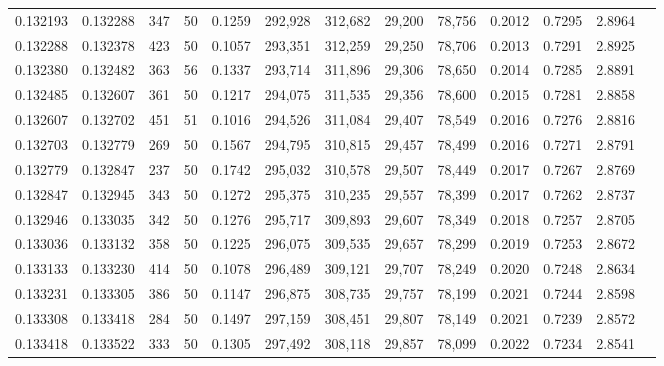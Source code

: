 \begin{tabular}{rrrrrrrrrrrrr}
0.132193 & 0.132288 &   347 &  50 &                                     0.1259 & 292,928 & 312,682 &  29,200 &  78,756 & 0.2012 & 0.7295 & 2.8964 \\
0.132288 & 0.132378 &   423 &  50 &                                     0.1057 & 293,351 & 312,259 &  29,250 &  78,706 & 0.2013 & 0.7291 & 2.8925 \\
0.132380 & 0.132482 &   363 &  56 &                                     0.1337 & 293,714 & 311,896 &  29,306 &  78,650 & 0.2014 & 0.7285 & 2.8891 \\
0.132485 & 0.132607 &   361 &  50 &                                     0.1217 & 294,075 & 311,535 &  29,356 &  78,600 & 0.2015 & 0.7281 & 2.8858 \\
0.132607 & 0.132702 &   451 &  51 &                                     0.1016 & 294,526 & 311,084 &  29,407 &  78,549 & 0.2016 & 0.7276 & 2.8816 \\
0.132703 & 0.132779 &   269 &  50 &                                     0.1567 & 294,795 & 310,815 &  29,457 &  78,499 & 0.2016 & 0.7271 & 2.8791 \\
0.132779 & 0.132847 &   237 &  50 &                                     0.1742 & 295,032 & 310,578 &  29,507 &  78,449 & 0.2017 & 0.7267 & 2.8769 \\
0.132847 & 0.132945 &   343 &  50 &                                     0.1272 & 295,375 & 310,235 &  29,557 &  78,399 & 0.2017 & 0.7262 & 2.8737 \\
0.132946 & 0.133035 &   342 &  50 &                                     0.1276 & 295,717 & 309,893 &  29,607 &  78,349 & 0.2018 & 0.7257 & 2.8705 \\
0.133036 & 0.133132 &   358 &  50 &                                     0.1225 & 296,075 & 309,535 &  29,657 &  78,299 & 0.2019 & 0.7253 & 2.8672 \\
0.133133 & 0.133230 &   414 &  50 &                                     0.1078 & 296,489 & 309,121 &  29,707 &  78,249 & 0.2020 & 0.7248 & 2.8634 \\
0.133231 & 0.133305 &   386 &  50 &                                     0.1147 & 296,875 & 308,735 &  29,757 &  78,199 & 0.2021 & 0.7244 & 2.8598 \\
0.133308 & 0.133418 &   284 &  50 &                                     0.1497 & 297,159 & 308,451 &  29,807 &  78,149 & 0.2021 & 0.7239 & 2.8572 \\
0.133418 & 0.133522 &   333 &  50 &                                     0.1305 & 297,492 & 308,118 &  29,857 &  78,099 & 0.2022 & 0.7234 & 2.8541 \\

\end{tabular}
